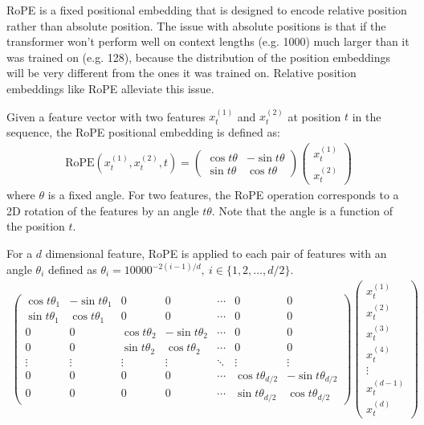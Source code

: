 \begin{enumerate}[(a)]
RoPE is a fixed positional embedding that is designed to encode relative position rather than absolute position. The issue with absolute positions is that if the transformer won't perform well on context lengths (e.g. 1000) much larger than it was trained on (e.g. 128), because the distribution of the position embeddings will be very different from the ones it was trained on. Relative position embeddings like RoPE alleviate this issue.

Given a feature vector with two features $x^{(1)}_t$ and $x^{(2)}_t$ at position $t$ in the sequence, the RoPE positional embedding is defined as:
\begin{align*}
    \text{RoPE}(x^{(1)}_t, x^{(2)}_t, t) = \begin{pmatrix} \cos t\theta & -\sin t\theta \\ \sin t\theta  & \cos t\theta \end{pmatrix} \begin{pmatrix} x^{(1)}_t \\ x^{(2)}_t \end{pmatrix}
\end{align*}
where $\theta$ is a fixed angle. For two features, the RoPE operation corresponds to a 2D rotation of the features by an angle $t\theta$. Note that the angle is a function of the position $t$.

For a $d$ dimensional feature, RoPE is applied to each pair of features with an angle $\theta_i$ defined as $\theta_i = 10000^{-2(i-1)/d},\ i \in \{1, 2, \ldots, d/2\}$.
\begin{align}
    \label{eq:rope_matrix}
    \begin{pmatrix}
    \cos t\theta_1 & -\sin t\theta_1 & 0 & 0 & \cdots & 0 & 0\\
    \sin t\theta_1 & \cos t\theta_1 & 0 & 0 & \cdots & 0 & 0\\
    0 & 0 & \cos t\theta_2 & -\sin t\theta_2 & \cdots & 0 & 0\\
    0 & 0 & \sin t\theta_2 & \cos t\theta_2 & \cdots & 0 & 0\\
    \vdots & \vdots & \vdots & \vdots & \ddots & \vdots & \vdots\\
    0 & 0 & 0 & 0 & \cdots & \cos t\theta_{d/2} & -\sin t\theta_{d/2}\\
    0 & 0 & 0 & 0 & \cdots & \sin t\theta_{d/2} & \cos t\theta_{d/2}
    \end{pmatrix}
    \begin{pmatrix}
        x^{(1)}_t \\ x^{(2)}_t \\ x^{(3)}_t \\ x^{(4)}_t \\ \vdots \\ x^{(d-1)}_t \\ x^{(d)}_t 
    \end{pmatrix}
\end{align}



\end{enumerate}
